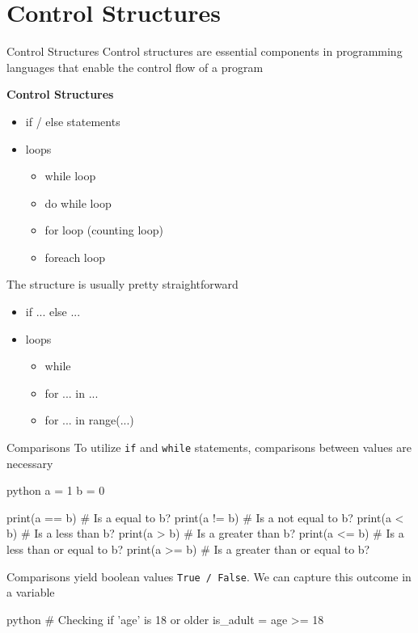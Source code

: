 \documentclass[
	11pt, 
]{beamer}
\begin{document}
\section{Control Structures}
\begin{frame}{Control Structures}
Control structures are essential components in programming languages that enable the control flow of a program

\begin{block}{\textbf{Control Structures}}
\begin{itemize}
\item if / else statements
\item loops
\begin{itemize}
    \item while loop
    \item do while loop
    \item for loop (counting loop)
    \item foreach loop
\end{itemize}
\end{itemize}

\end{block}

The structure is usually pretty straightforward

\begin{itemize}
\item if ... else ...
\item loops
\begin{itemize}
    \item while
    \item for ... in ...
    \item for ... in range(...)
\end{itemize}
\end{itemize}
\end{frame}


\begin{frame}[fragile]{Comparisons}
To utilize \texttt{if} and \texttt{while} statements, comparisons between values are necessary

\begin{mintedbox}{python}
a = 1
b = 0

print(a == b)  # Is a equal to b?
print(a != b)  # Is a not equal to b?
print(a < b)   # Is a less than b?
print(a > b)   # Is a greater than b?
print(a <= b)  # Is a less than or equal to b?
print(a >= b)  # Is a greater than or equal to b?
\end{mintedbox}

Comparisons yield boolean values \texttt{True / False}. We can capture this outcome in a variable

\begin{mintedbox}{python}
# Checking if 'age' is 18 or older
is_adult = age >= 18  
\end{mintedbox}


\end{frame}
\end{document}
